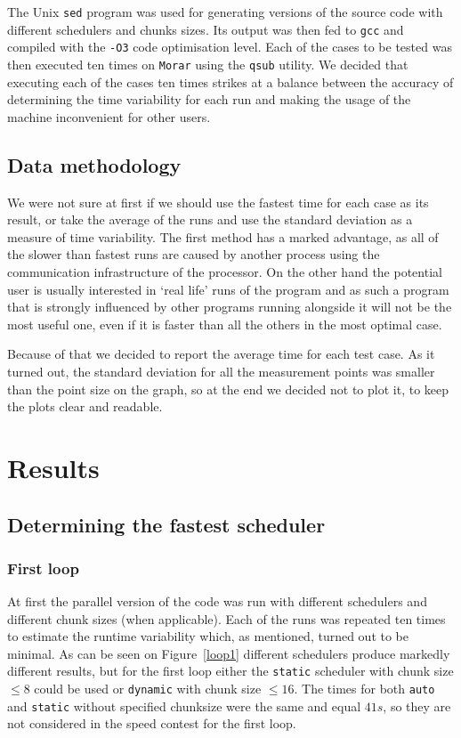\documentclass[11pt,a4paper]{article}
\begin{document}
The Unix \texttt{sed} program was used for generating versions of the source code with different schedulers and chunks sizes. Its output was then fed to \texttt{gcc} and compiled with the \texttt{-O3} code optimisation level. Each of the cases to be tested was then executed ten times on \texttt{Morar} using the \texttt{qsub} utility. We decided that executing each of the cases ten times strikes at a balance between the accuracy of determining the time variability for each run and making the usage of the machine inconvenient for other users.

\subsection{Data methodology}
We were not sure at first if we should use the fastest time for each case as its result, or take the average of the runs and use the standard deviation as a measure of time variability. The first method has a marked advantage, as all of the slower than fastest runs are caused by another process using the communication infrastructure of the processor. On the other hand the potential user is usually interested in `real life' runs of the program and as such a program that is strongly influenced by other programs running alongside it will not be the most useful one, even if it is faster than all the others in the most optimal case. 

Because of that we decided to report the average time for each test case. As it turned out, the standard deviation for all the measurement points was smaller than the point size on the graph, so at the end we decided not to plot it, to keep the plots clear and readable.

\section{Results}
\subsection{Determining the fastest scheduler}
\subsubsection{First loop}
At first the parallel version of the code was run with different schedulers and different chunk sizes (when applicable). Each of the runs was repeated ten times to estimate the runtime variability which, as mentioned, turned out to be minimal. As can be seen on Figure~\ref{loop1} different schedulers produce markedly different results, but for the first loop either the \texttt{static} scheduler with chunk size \(\leq 8\) could be used or \texttt{dynamic} with chunk size \(\leq 16\). The times for both \texttt{auto} and \texttt{static} without specified chunksize were the same and equal \(41s\), so they are not considered in the speed contest for the first loop.
\end{document}
